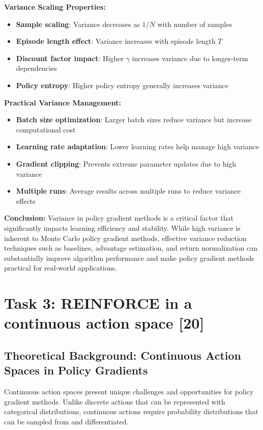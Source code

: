 \documentclass[12pt]{article}
\begin{document}
{{{\textbf{Variance Scaling Properties:}
\begin{itemize}
    \item \textbf{Sample scaling}: Variance decreases as $1/N$ with number of samples
    \item \textbf{Episode length effect}: Variance increases with episode length $T$
    \item \textbf{Discount factor impact}: Higher $\gamma$ increases variance due to longer-term dependencies
    \item \textbf{Policy entropy}: Higher policy entropy generally increases variance
\end{itemize}

\textbf{Practical Variance Management:}
\begin{itemize}
    \item \textbf{Batch size optimization}: Larger batch sizes reduce variance but increase computational cost
    \item \textbf{Learning rate adaptation}: Lower learning rates help manage high variance
    \item \textbf{Gradient clipping}: Prevents extreme parameter updates due to high variance
    \item \textbf{Multiple runs}: Average results across multiple runs to reduce variance effects
\end{itemize}

\textbf{Conclusion:}
Variance in policy gradient methods is a critical factor that significantly impacts learning efficiency and stability. While high variance is inherent to Monte Carlo policy gradient methods, effective variance reduction techniques such as baselines, advantage estimation, and return normalization can substantially improve algorithm performance and make policy gradient methods practical for real-world applications.

\newpage

\section{Task 3: REINFORCE in a continuous action space [20]}

\subsection{Theoretical Background: Continuous Action Spaces in Policy Gradients}

Continuous action spaces present unique challenges and opportunities for policy gradient methods. Unlike discrete actions that can be represented with categorical distributions, continuous actions require probability distributions that can be sampled from and differentiated.

}}}
\end{document}
